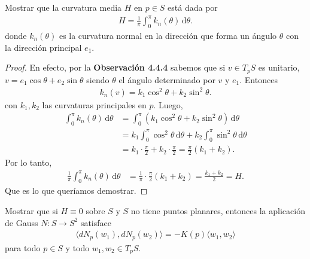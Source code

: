 \documentclass{article}
\newenvironment{theorem}[2][Ejercicio]{\begin{trivlist}
\item[\hskip \labelsep {\bfseries #1}\hskip \labelsep {\bfseries #2.}]}{\end{trivlist}}
\begin{document}
\vspace{1em}

\begin{theorem}{4}
    Mostrar que la curvatura media \( H \) en \( p \in S \) está dada por \begin{align*}
        H = \frac{1}{\pi} \int_0^{\pi} k_n(\theta) \, \mathrm{d}\theta.
    \end{align*}
    donde \( k_n(\theta) \) es la curvatura normal en la dirección que forma un ángulo \( \theta \) con la dirección principal \( e_1 \).
\end{theorem}

\begin{proof}
    En efecto, por la \textbf{Observación 4.4.4} sabemos que si \( v \in T_p S\) es unitario, \( v = e_1 \cos \theta + e_2 \sin \theta \) siendo \( \theta \) el ángulo determinado por \( v \) y \( e_1 \). Entonces \begin{align*}
        k_n(v) = k_1 \cos^2 \theta + k_2 \sin^2 \theta.
    \end{align*}
    con \( k_1, k_2 \) las curvaturas principales en \( p \). Luego, \begin{align*}
        \int_0^{\pi} k_n(\theta) \, \mathrm{d}\theta & = \int_0^{\pi} (k_1 \cos^2 \theta + k_2 \sin^2 \theta) \, \mathrm{d}\theta                                \\
                                                     & = k_1 \int_0^{\pi} \cos^2 \theta \, \mathrm{d}\theta + k_2 \int_0^{\pi} \sin^2 \theta \, \mathrm{d}\theta \\
                                                     & = k_1 \cdot \frac{\pi}{2} + k_2 \cdot \frac{\pi}{2} = \frac{\pi}{2}(k_1 + k_2).
    \end{align*}
    Por lo tanto, \begin{align*}
        \frac{1}{\pi} \int_0^{\pi} k_n(\theta) \, \mathrm{d}\theta & = \frac{1}{\pi} \cdot \frac{\pi}{2}(k_1 + k_2) = \frac{k_1 + k_2}{2} = H.
    \end{align*}
    Que es lo que queríamos demostrar.
\end{proof}

\vspace{1em}

\begin{theorem}{6}
    Mostrar que si \( H \equiv 0 \) sobre \( S \) y \( S \) no tiene puntos planares, entonces la aplicación de Gauss \( N: S \to S^2 \) satisface \begin{align*}
        \langle dN_p(w_1), dN_p(w_2) \rangle = -K(p) \langle w_1, w_2 \rangle
    \end{align*}
    para todo \( p \in S \) y todo \( w_1, w_2 \in T_p S \).
\end{theorem}
\end{document}
